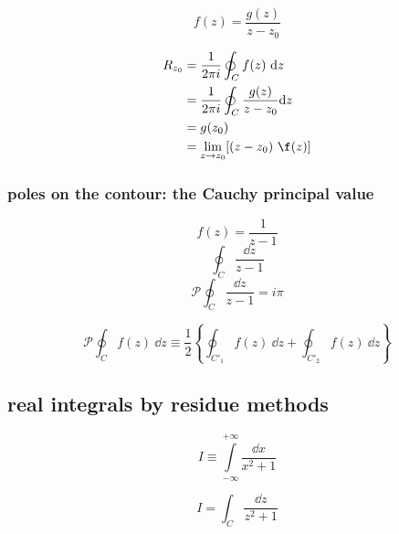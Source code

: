 \documentclass[10pt, a4paper, twocolumn]{article}
\newcommand{\intinf}{\ensuremath{\int\limits_{-\infty}^{+\infty}}}
\begin{document}
\[ f(z)=\frac{g(z)}{z-z_0}\]

\begin{equation*}
  \begin{aligned}
    R_{z_0}&=\frac{1}{2\pi i}
    \oint _Cf(z)\ \dd z
    \\&=\frac{1}{2\pi i}
    \oint _C\frac{g(z)}{z-z_0}\dd z
    \\&=g(z_0)
    \\&=\lim _{z\to z_0}[(z-z_0)\ \f(z)]
  \end{aligned}
  \end{equation*}
  \subsubsection{poles on the contour: the Cauchy principal value}

\[f(z)=\frac{1}{z-1}\]
\[\oint _C\frac{\dd z}{z-1}\]
 \[\mathcal{P} \oint _C\frac{\dd z}{z-1} = i\pi\]

 \[\mathcal{P}\oint_Cf(z)\ \dd z
   \equiv \frac12
   \left\{
     \oint_{C'_1} f(z)\ \dd z
     +\oint_{C'_2} f(z)\ \dd z
\right\} \]

\subsection{real integrals by residue methods}

\[I\equiv \intinf \frac{\dd x}{x^2+1}\]


\[I=\int_C\frac{\dd z}{z^2+1}\]
\end{document}

